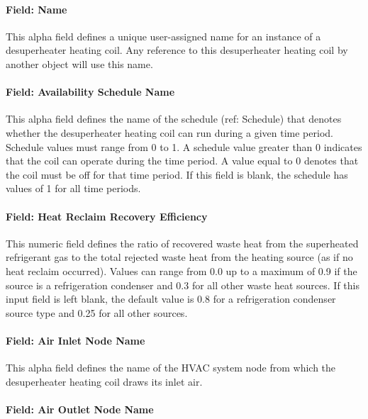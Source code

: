 \paragraph{Field: Name}\label{field-name-5-009}

This alpha field defines a unique user-assigned name for an instance of a desuperheater heating coil. Any reference to this desuperheater heating coil by another object will use this name.

\paragraph{Field: Availability Schedule Name}\label{field-availability-schedule-name-009}

This alpha field defines the name of the schedule (ref: Schedule) that denotes whether the desuperheater heating coil can run during a given time period. Schedule values must range from 0 to 1. A schedule value greater than 0 indicates that the coil can operate during the time period. A value equal to 0 denotes that the coil must be off for that time period. If this field is blank, the schedule has values of 1 for all time periods.

\paragraph{Field: Heat Reclaim Recovery Efficiency}\label{field-heat-reclaim-recovery-efficiency}

This numeric field defines the ratio of recovered waste heat from the superheated refrigerant gas to the total rejected waste heat from the heating source (as if no heat reclaim occurred). Values can range from 0.0 up to a maximum of 0.9 if the source is a refrigeration condenser and 0.3 for all other waste heat sources. If this input field is left blank, the default value is 0.8 for a refrigeration condenser source type and 0.25 for all other sources.

\paragraph{Field: Air Inlet Node Name}\label{field-air-inlet-node-name-5-000}

This alpha field defines the name of the HVAC system node from which the desuperheater heating coil draws its inlet air.

\paragraph{Field: Air Outlet Node Name}\label{field-air-outlet-node-name-5-000}

